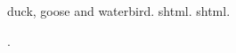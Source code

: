 \documentclass{article}
\begin{document}
\Gls{duck}, \gls{goose} and \gls{waterbird}.
\Gls{shtml}. \Gls{shtml}.

.

\printunsrtglossaries
\end{document}
